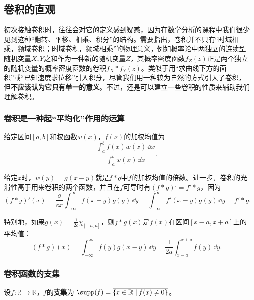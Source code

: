 \subsection{卷积的直观}\label{sub:intuition_of_convolution}
初次接触卷积时，往往会对它的定义感到疑惑，因为在数学分析的课程中我们很少见到这种“翻转、平移、相乘、积分”的结构。需要指出，卷积并不只有“时域相乘，频域卷积；时域卷积，频域相乘”的物理意义，例如概率论中两独立的连续型随机变量$X,Y$之和作为一种新的随机变量$Z$，其概率密度函数$f_Z(z)$正是两个独立的随机变量的概率密度函数的卷积$f_X*f_Y(z)$。类似于用“求曲线下方的面积”或“已知速度求位移”引入积分，尽管我们用一种较为自然的方式引入了卷积，但\textbf{不应该认为它只有单一的意义}。不过，还是可以建立一些卷积的性质来辅助我们理解卷积。

\subsubsection{卷积是一种起“平均化”作用的运算}
\begin{definition}[加权均值]
    给定区间$[a,b]$和权函数$w(x)$，$f(x)$的加权均值为
    \begin{equation}
        \frac{\int_{a}^{b}f(x)w(x)\,\dd x}{\int_{a}^{b}w(x)\,\dd x}.
    \end{equation}
\end{definition}
给定$x$时，$w(y)=g(x-y)$就是$f*g$中$f$的加权均值的倍数。进一步，卷积的光滑性高于用来卷积的两个函数，并且在$f$可导时有$(f*g)'=f'*g$，因为
\begin{equation}
    (f*g)'(x)=\frac{\dd}{\dd x}\int_{-\infty}^{\infty}f(x-y)g(y)\,\dd y=\int_{-\infty}^{\infty}f'(x-y)g(y)\,\dd y=f'*g.
\end{equation}

特别地，如果$g(x)=\frac{1}{2a}\chi_{[-a,a]}$，则$f*g(x)$是$f(x)$在区间$[x-a,x+a]$上的平均值：
\begin{equation}
    (f*g)(x)=\int_{-\infty}^{\infty}f(y)g(x-y)\,\dd y=\frac{1}{2a}\int_{x-a}^{x+a}f(y)\,\dd y.
\end{equation}

\subsubsection{卷积函数的支集}

\begin{definition}[支集]
    设$f:\mathbb{R}\to \mathbb{R}$，$f$的\textbf{支集}为
    $\supp(f)=\overline{\{x\in\mathbb{R} \mid f(x)\neq 0\}}$。
\end{definition}

